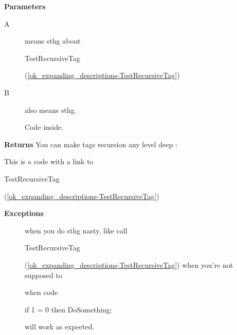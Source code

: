 \documentclass{report}
\begin{document}
\begin{list}{}
 \par
\item[\textbf{Parameters}]
\begin{description}
\item[A] means sthg about \begin{ttfamily}TestRecursiveTag\end{ttfamily}(\ref{ok_expanding_descriptions-TestRecursiveTag})
\item[B] also means sthg. \begin{ttfamily}Code inside.\end{ttfamily}
\end{description}
\item[\textbf{Returns}]You can make tags recursion any level deep : \begin{ttfamily}This is a code with a link to \begin{ttfamily}TestRecursiveTag\end{ttfamily}(\ref{ok_expanding_descriptions-TestRecursiveTag})\end{ttfamily}
\item[\textbf{Exceptions}]
\begin{description}
\item[\begin{ttfamily}EFoo\end{ttfamily}(\ref{ok_expanding_descriptions.EFoo})] when you do sthg nasty, like call \begin{ttfamily}TestRecursiveTag\end{ttfamily}(\ref{ok_expanding_descriptions-TestRecursiveTag}) when you're not supposed to
\item[\begin{ttfamily}EBar\end{ttfamily}(\ref{ok_expanding_descriptions.EBar})] when code \begin{ttfamily}if 1 = 0 then DoSomething;\end{ttfamily} will work as expected.
\end{description}


\end{list}
\end{document}
